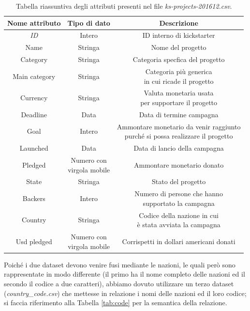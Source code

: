 \begin{table}
	\caption{Tabella riassuntiva degli attributi presenti nel file \textit{ks-projects-201612.csv}.}
	
	\label{tab:ks}
	
	\centering
	\begin{tabular}{|c|c|c|}
		\hline
		\textbf{Nome attributo} & \textbf{Tipo di dato} & \textbf{Descrizione} \\ 
		\hline  
		\rule{0pt}{13pt}\emph{ID} & Intero & ID interno di kickstarter \\ 
		\hline  
		\rule{0pt}{13pt}Name & Stringa & Nome del progetto \\ 
		\hline  
		\rule{0pt}{13pt}Category & Stringa & Categoria specfica del progetto \\ 
		\hline  
		\rule{0pt}{24pt}Main category & Stringa & \shortstack{Categoria più generica \\ in cui ricade il progetto} \\ 
		\hline   
		\rule{0pt}{24pt}Currency & Stringa & \shortstack{Valuta monetaria usata \\ per supportare il progetto} \\ 
		\hline   
		\rule{0pt}{13pt}Deadline & Data & Data di termine campagna \\ 
		\hline   
		\rule{0pt}{24pt}Goal & Intero & \shortstack{Ammontare monetario da venir raggiunto \\ purché si possa realizzare il progetto} \\ 
		\hline  
		\rule{0pt}{13pt}Launched & Data & Data di lancio della campagna \\ 
		\hline  
		\rule{0pt}{24pt}Pledged & \shortstack{Numero con \\ virgola mobile} & Ammontare monetario donato \\ 
		\hline  
		\rule{0pt}{13pt}State & Stringa & Stato del progetto \\ 
		\hline  
		\rule{0pt}{24pt}Backers & Intero & \shortstack{Numero di persone che hanno \\ supportato la campagna} \\ 
		\hline  
		\rule{0pt}{24pt}Country & Stringa & \shortstack{Codice della nazione in cui \\ è stata avviata la campagna} \\ 
		\hline  
		\rule{0pt}{24pt}Usd pledged & \shortstack{Numero con \\ virgola mobile} & Corrispetti in dollari americani donati \\ 
		\hline
	\end{tabular}
\end{table} 
Poiché i due dataset devono venire fusi mediante le nazioni, le quali però sono rappresentate in modo differente (il primo ha il nome completo delle nazioni ed il secondo il codice a due caratteri), abbiamo dovuto utilizzare un terzo dataset (\textit{country\_code.csv}) che mettesse in relazione i nomi delle nazioni ed il loro codice; si faccia riferimento alla Tabella \ref{tab:code} per la semantica della relazione.

